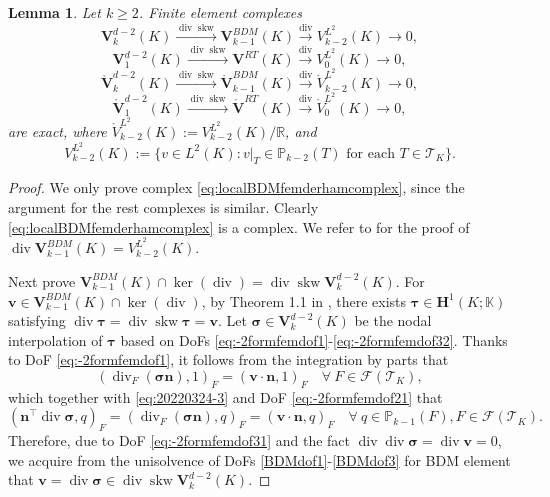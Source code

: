 \documentclass[10pt]{amsart}
\newtheorem{lemma}[theorem]{Lemma}
\renewcommand{\div}{\operatorname{div}}
\newcommand{\skw}{\operatorname{skw}}
\numberwithin{equation}{section}
\begin{document}
\begin{lemma}
Let $k\geq2$. Finite element complexes
\begin{equation}\label{eq:localBDMfemderhamcomplex}
\boldsymbol{V}_{k}^{d-2}(K)\xrightarrow{\div\skw}\boldsymbol{V}_{k-1}^{BDM}(K)\xrightarrow{\div} V_{k-2}^{L^2}(K)\to0,    
\end{equation}
\begin{equation}\label{eq:localRTfemderhamcomplex}
\boldsymbol{V}_{1}^{d-2}(K)\xrightarrow{\div\skw}\boldsymbol{V}^{RT}(K)\xrightarrow{\div} V_{0}^{L^2}(K)\to0,    
\end{equation}
\begin{equation}\label{eq:localBDMfemderhamcomplex0}
\mathring{\boldsymbol{V}}_{k}^{d-2}(K)\xrightarrow{\div\skw}\mathring{\boldsymbol{V}}_{k-1}^{BDM}(K)\xrightarrow{\div} \mathring{V}_{k-2}^{L^2}(K)\to0,    
\end{equation}
\begin{equation}\label{eq:localRTfemderhamcomplex0}
\mathring{\boldsymbol{V}}_{1}^{d-2}(K)\xrightarrow{\div\skw}\mathring{\boldsymbol{V}}^{RT}(K)\xrightarrow{\div} \mathring{V}_{0}^{L^2}(K)\to0,    
\end{equation}
are exact, where $\mathring{V}_{k-2}^{L^2}(K):=V_{k-2}^{L^2}(K)/\mathbb R$, and
\[
V_{k-2}^{L^2}(K):=\{v\in L^2(K): v|_{T}\in \mathbb P_{k-2}(T) \textrm{ for each } T\in\mathcal T_K\}.
\]
\end{lemma}
\begin{proof}
We only prove complex \eqref{eq:localBDMfemderhamcomplex}, since the argument for the rest complexes is similar. Clearly \eqref{eq:localBDMfemderhamcomplex} is a complex. We refer to \cite[Section 4]{ChenHuang2021divX} for the proof of $\div\boldsymbol{V}_{k-1}^{BDM}(K)=V_{k-2}^{L^2}(K)$.

Next prove $\boldsymbol{V}_{k-1}^{BDM}(K)\cap\ker(\div)=\div\skw\boldsymbol{V}_{k}^{d-2}(K)$. For $\boldsymbol{v}\in\boldsymbol{V}_{k-1}^{BDM}(K)\cap\ker(\div)$, by Theorem 1.1 in \cite{CostabelMcIntosh2010}, there exists $\boldsymbol{\tau}\in\boldsymbol{H}^1(K;\mathbb K)$ satisfying $\div\boldsymbol{\tau}=\div\skw\boldsymbol{\tau}=\boldsymbol{v}$. Let $\boldsymbol{\sigma}\in \boldsymbol{V}_{k}^{d-2}(K)$ be the nodal interpolation of $\boldsymbol{\tau}$ based on DoFs \eqref{eq:-2formfemdof1}-\eqref{eq:-2formfemdof32}. Thanks to DoF \eqref{eq:-2formfemdof1}, it follows from the integration by parts that
\[
(\div_F(\boldsymbol{\sigma}\boldsymbol{n}), 1)_F=(\boldsymbol{v}\cdot\boldsymbol{n}, 1)_F\quad\forall~F\in\mathcal F(\mathcal T_K),
\]
which together with \eqref{eq:20220324-3} and DoF \eqref{eq:-2formfemdof21} that
\[
(\boldsymbol{n}^{\intercal}\div\boldsymbol{\sigma}, q)_F = (\div_F(\boldsymbol{\sigma}\boldsymbol{n}), q)_F=(\boldsymbol{v}\cdot\boldsymbol{n}, q)_F\quad\forall~q\in \mathbb P_{k-1}(F),F\in\mathcal F(\mathcal T_K).
\]
Therefore, due to DoF \eqref{eq:-2formfemdof31} and the fact $\div\div\boldsymbol{\sigma}=\div\boldsymbol{v}=0$,
we acquire from the unisolvence of DoFs \eqref{BDMdof1}-\eqref{BDMdof3} for BDM element that $\boldsymbol{v}=\div\boldsymbol{\sigma} \in \div\skw\boldsymbol{V}_{k}^{d-2}(K)$.
\end{proof}
\end{document}
